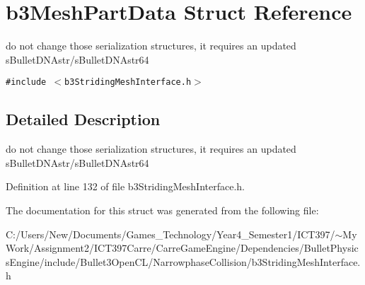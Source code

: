 \hypertarget{structb3_mesh_part_data}{
\section{b3MeshPartData Struct Reference}
\label{structb3_mesh_part_data}
}
do not change those serialization structures, it requires an updated sBulletDNAstr/sBulletDNAstr64  


{\tt \#include $<$b3StridingMeshInterface.h$>$}



\subsection{Detailed Description}
do not change those serialization structures, it requires an updated sBulletDNAstr/sBulletDNAstr64 

Definition at line 132 of file b3StridingMeshInterface.h.

The documentation for this struct was generated from the following file:\begin{CompactItemize}
\item 
C:/Users/New/Documents/Games\_\-Technology/Year4\_\-Semester1/ICT397/$\sim$My Work/Assignment2/ICT397Carre/CarreGameEngine/Dependencies/BulletPhysicsEngine/include/Bullet3OpenCL/NarrowphaseCollision/b3StridingMeshInterface.h\end{CompactItemize}
